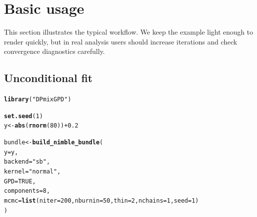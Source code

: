 \documentclass[article]{jss}\usepackage[]{graphicx}\usepackage[]{xcolor}
\makeatletter
\newcommand{\hlnum}[1]{\textcolor[rgb]{0.686,0.059,0.569}{#1}}%
\newcommand{\hlsng}[1]{\textcolor[rgb]{0.192,0.494,0.8}{#1}}%
\newcommand{\hlopt}[1]{\textcolor[rgb]{0,0,0}{#1}}%
\newcommand{\hldef}[1]{\textcolor[rgb]{0.345,0.345,0.345}{#1}}%
\newcommand{\hlkwb}[1]{\textcolor[rgb]{0.69,0.353,0.396}{#1}}%
\newcommand{\hlkwc}[1]{\textcolor[rgb]{0.333,0.667,0.333}{#1}}%
\newcommand{\hlkwd}[1]{\textcolor[rgb]{0.737,0.353,0.396}{\textbf{#1}}}%
\newenvironment{kframe}{%
 \def\at@end@of@kframe{}%
 \ifinner\ifhmode%
  \def\at@end@of@kframe{\end{minipage}}%
  \begin{minipage}{\columnwidth}%
 \fi\fi%
 \def\FrameCommand##1{\hskip\@totalleftmargin \hskip-\fboxsep
 \colorbox{shadecolor}{##1}\hskip-\fboxsep
     \hskip-\linewidth \hskip-\@totalleftmargin \hskip\columnwidth}%
 \MakeFramed {\advance\hsize-\width
   \@totalleftmargin\z@ \linewidth\hsize
   \@setminipage}}%
 {\par\unskip\endMakeFramed%
 \at@end@of@kframe}
\newenvironment{knitrout}{}{} %
\makeatother
\begin{document}
\section{Basic usage}

This section illustrates the typical workflow.
We keep the example light enough to render quickly, but in real analysis users should increase iterations and check convergence diagnostics carefully.

\subsection{Unconditional fit}

\begin{knitrout}
\color{fgcolor}\begin{kframe}
\begin{alltt}
\hlkwd{library}\hldef{(}\hlsng{"DPmixGPD"}\hldef{)}

\hlkwd{set.seed}\hldef{(}\hlnum{1}\hldef{)}
\hldef{y} \hlkwb{<-} \hlkwd{abs}\hldef{(}\hlkwd{rnorm}\hldef{(}\hlnum{80}\hldef{))} \hlopt{+} \hlnum{0.2}

\hldef{bundle} \hlkwb{<-} \hlkwd{build_nimble_bundle}\hldef{(}
  \hlkwc{y} \hldef{= y,}
  \hlkwc{backend} \hldef{=} \hlsng{"sb"}\hldef{,}
  \hlkwc{kernel}  \hldef{=} \hlsng{"normal"}\hldef{,}
  \hlkwc{GPD}     \hldef{=} \hlnum{TRUE}\hldef{,}
  \hlkwc{components} \hldef{=} \hlnum{8}\hldef{,}
  \hlkwc{mcmc} \hldef{=} \hlkwd{list}\hldef{(}\hlkwc{niter} \hldef{=} \hlnum{200}\hldef{,} \hlkwc{nburnin} \hldef{=} \hlnum{50}\hldef{,} \hlkwc{thin} \hldef{=} \hlnum{2}\hldef{,} \hlkwc{nchains} \hldef{=} \hlnum{1}\hldef{,} \hlkwc{seed} \hldef{=} \hlnum{1}\hldef{)}
\hldef{)}


\end{alltt}
\end{kframe}
\end{knitrout}
\end{document}
